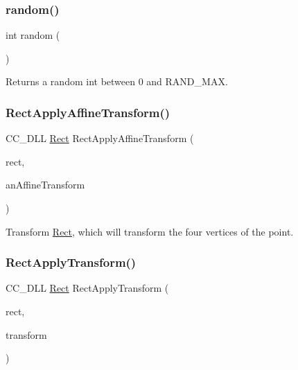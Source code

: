 \subsubsection{\texorpdfstring{random()}{random()}\hspace{0.1cm}{\footnotesize\ttfamily [2/2]}}
{\footnotesize\ttfamily int random (\begin{DoxyParamCaption}{ }\end{DoxyParamCaption})\hspace{0.3cm}{\ttfamily [inline]}}

Returns a random int between 0 and R\+A\+N\+D\+\_\+\+M\+AX. \mbox{\label{group__base_gad5ce61c33cc9b7cdce94ce8d8d5a38a6}} 
\subsubsection{\texorpdfstring{Rect\+Apply\+Affine\+Transform()}{RectApplyAffineTransform()}}
{\footnotesize\ttfamily C\+C\+\_\+\+D\+LL \hyperlink{classRect}{Rect} Rect\+Apply\+Affine\+Transform (\begin{DoxyParamCaption}\item[{const \hyperlink{classRect}{Rect} \&}]{rect,  }\item[{const \hyperlink{structAffineTransform}{Affine\+Transform} \&}]{an\+Affine\+Transform }\end{DoxyParamCaption})}

Transform \hyperlink{classRect}{Rect}, which will transform the four vertices of the point. \mbox{\label{group__base_ga44db1250c00eeefdf29f56f8121b1301}} 
\subsubsection{\texorpdfstring{Rect\+Apply\+Transform()}{RectApplyTransform()}}
{\footnotesize\ttfamily C\+C\+\_\+\+D\+LL \hyperlink{classRect}{Rect} Rect\+Apply\+Transform (\begin{DoxyParamCaption}\item[{const \hyperlink{classRect}{Rect} \&}]{rect,  }\item[{const \hyperlink{classMat4}{Mat4} \&}]{transform }\end{DoxyParamCaption})}

